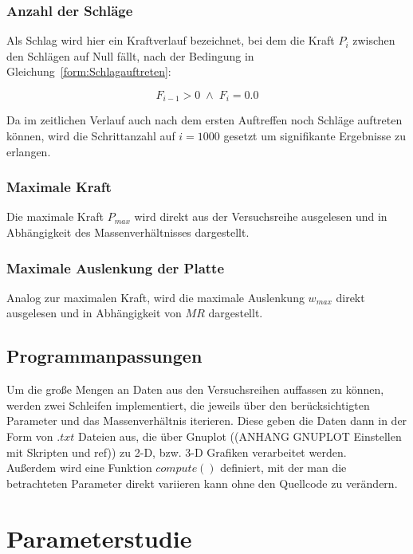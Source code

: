 \subsubsection{Anzahl der Schläge}

Als Schlag wird hier ein Kraftverlauf bezeichnet, bei dem die Kraft $P_{i}$ zwischen den Schlägen auf Null fällt, nach der Bedingung in Gleichung~\ref{form:Schlagauftreten}:

\begin{equation} 
	\label{form:Schlagauftreten}
	F_{i-1} > 0 \; \wedge \; F_{i} = 0.0 
\end{equation}

Da im zeitlichen Verlauf auch nach dem ersten Auftreffen noch Schläge auftreten können, wird die Schrittanzahl auf $i = 1000$ gesetzt um signifikante Ergebnisse zu erlangen. 

\subsubsection{Maximale Kraft}

Die maximale Kraft $P_{max}$ wird direkt aus der Versuchsreihe ausgelesen und in Abhängigkeit des Massenverhältnisses dargestellt.

\subsubsection{Maximale Auslenkung der Platte}
Analog zur maximalen Kraft, wird die maximale Auslenkung $w_{max}$ direkt ausgelesen und in Abhängigkeit von $MR$ dargestellt.

\subsection{Programmanpassungen}

Um die große Mengen an Daten aus den Versuchsreihen auffassen zu können, werden zwei Schleifen implementiert, die jeweils über den berücksichtigten Parameter und das Massenverhältnis iterieren. Diese geben die Daten dann in der Form von $.txt$ Dateien aus, die über Gnuplot ((ANHANG GNUPLOT Einstellen mit Skripten und ref)) zu 2-D, bzw. 3-D Grafiken verarbeitet werden.\\
Außerdem wird eine Funktion $compute()$ definiert, mit der man die betrachteten Parameter direkt variieren kann ohne den Quellcode zu verändern. 

\section{Parameterstudie}

